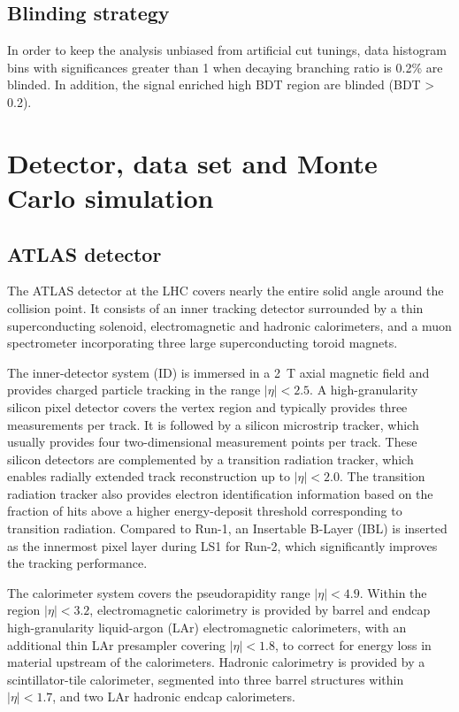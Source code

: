 \subsection{Blinding strategy}
\label{sec:blind}

In order to keep the analysis unbiased from artificial cut tunings, data histogram bins with significances greater than 1 when decaying branching ratio is 0.2\% are blinded. In addition, the signal enriched high BDT region are blinded (BDT > 0.2).

\section{Detector, data set and Monte Carlo simulation}

\subsection{ATLAS detector}
\label{sec:detector}

The ATLAS detector \cite{PERF-2007-01} at the LHC covers nearly the entire solid angle around the collision point. It consists of an inner tracking detector surrounded by a thin superconducting solenoid, electromagnetic and hadronic calorimeters, and a muon spectrometer incorporating three large superconducting toroid magnets.

The inner-detector system (ID) is immersed in a \SI{2}{T} axial magnetic field and provides charged particle tracking in the range $| \eta | < 2.5$. A high-granularity silicon pixel detector covers the vertex region and typically provides three measurements per track. It is followed by a silicon microstrip tracker, which usually provides four two-dimensional measurement points per track. These silicon detectors are complemented by a transition radiation tracker, which enables radially extended track reconstruction up to $| \eta | < 2.0$. The transition radiation tracker also provides electron identification information based on the fraction of hits above a higher energy-deposit threshold corresponding to transition radiation. Compared to Run-1, an Insertable B-Layer \cite{IBL} (IBL) is inserted as the innermost pixel layer during LS1 for Run-2, which significantly improves the tracking performance.

The calorimeter system covers the pseudorapidity range $| \eta | < 4.9$. Within the region $| \eta | < 3.2$, electromagnetic calorimetry is provided by barrel and endcap high-granularity liquid-argon (LAr) electromagnetic calorimeters, with an additional thin LAr presampler covering $| \eta | < 1.8$, to correct for energy loss in material upstream of the calorimeters. Hadronic calorimetry is provided by a scintillator-tile calorimeter, segmented into three barrel structures within $| \eta | < 1.7$, and two LAr hadronic endcap calorimeters.

